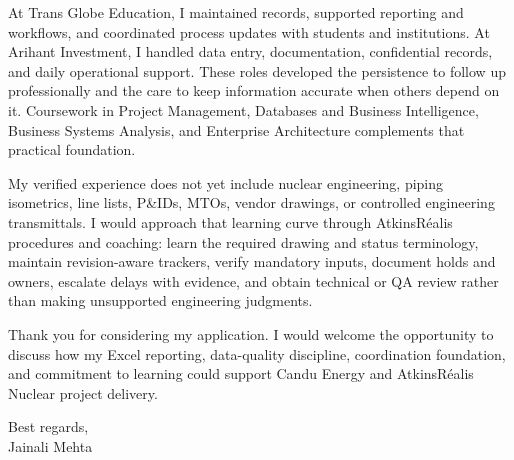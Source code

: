 \documentclass[letterpaper,11pt]{article}
\begin{document}
\bigbreak
At Trans Globe Education, I maintained records, supported reporting and workflows, and coordinated process updates with students and institutions. At Arihant Investment, I handled data entry, documentation, confidential records, and daily operational support. These roles developed the persistence to follow up professionally and the care to keep information accurate when others depend on it. Coursework in Project Management, Databases and Business Intelligence, Business Systems Analysis, and Enterprise Architecture complements that practical foundation.

\bigbreak
My verified experience does not yet include nuclear engineering, piping isometrics, line lists, P\&IDs, MTOs, vendor drawings, or controlled engineering transmittals. I would approach that learning curve through AtkinsRéalis procedures and coaching: learn the required drawing and status terminology, maintain revision-aware trackers, verify mandatory inputs, document holds and owners, escalate delays with evidence, and obtain technical or QA review rather than making unsupported engineering judgments.

\bigbreak
Thank you for considering my application. I would welcome the opportunity to discuss how my Excel reporting, data-quality discipline, coordination foundation, and commitment to learning could support Candu Energy and AtkinsRéalis Nuclear project delivery.

\bigbreak
Best regards,\\
Jainali Mehta
\end{document}
